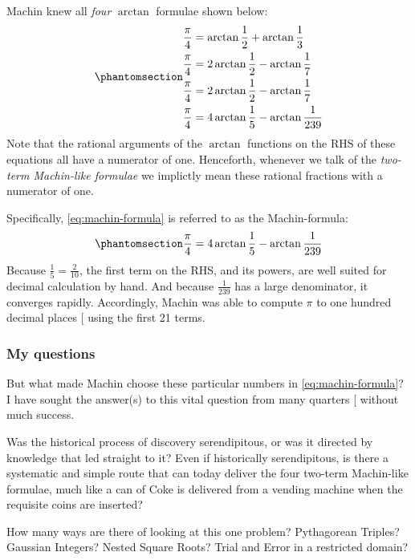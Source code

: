 \documentclass[
  a4paper,
]{article}
\begin{document}
Machin knew all \emph{four} \(\arctan\) formulae shown below:
\begin{equation}\phantomsection\label{eq:machin}{
\begin{aligned}
\frac{\pi}{4} &= \arctan\frac{1}{2} + \arctan\frac{1}{3}\\
\frac{\pi}{4} &= 2\arctan\frac{1}{2} - \arctan\frac{1}{7}\\
\frac{\pi}{4} &= 2\arctan\frac{1}{2} - \arctan\frac{1}{7}\\
\frac{\pi}{4} &= 4\arctan\frac{1}{5} - \arctan\frac {1}{239}
\end{aligned}
}\end{equation} Note that the rational arguments of the \(\arctan\)
functions on the RHS of these equations all have a numerator of one.
Henceforth, whenever we talk of the \emph{two-term Machin-like formulae}
we implictly mean these rational fractions with a numerator of one.

Specifically, \cref{eq:machin-formula} is referred to as the
Machin-formula:
\begin{equation}\phantomsection\label{eq:machin-formula}{
\frac{\pi}{4} = 4\arctan\frac{1}{5} - \arctan\frac {1}{239}
}\end{equation} Because \(\frac{1}{5} = \frac{2}{10}\), the first term
on the RHS, and its powers, are well suited for decimal calculation by
hand. And because \(\frac {1}{239}\) has a large denominator, it
converges rapidly. Accordingly, Machin was able to compute \(\pi\) to
one hundred decimal places {[}\citeproc{ref-beckmann-1971}{24}{]} using
the first 21 terms.

\subsubsection{My questions}\label{my-questions}

But what made Machin choose these particular numbers in
\cref{eq:machin-formula}? I have sought the answer(s) to this vital
question from many quarters {[}\citeproc{ref-mse-question-2024}{25}{]}
without much success.

Was the historical process of discovery serendipitous, or was it
directed by knowledge that led straight to it? Even if historically
serendipitous, is there a systematic and simple route that can today
deliver the four two-term Machin-like formulae, much like a can of Coke
is delivered from a vending machine when the requisite coins are
inserted?

How many ways are there of looking at this one problem? Pythagorean
Triples? Gaussian Integers? Nested Square Roots? Trial and Error in a
restricted domain?
\end{document}
